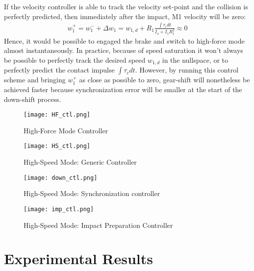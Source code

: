 If the velocity controller is able to track the velocity set-point and the collision is perfectly predicted, then immediately after the impact, M1 velocity will be zero:
%
\begin{align}
w_1^+ =  w_1^- + \Delta w_1 = w_{1,d}  + R_1 \frac{\int{\tau_c dt}}{I_o + I_1 R_1^2} \approx 0
\label{eq:dsdm_impact_vel}
\end{align}
%
Hence, it would be possible to engaged the brake and switch to high-force mode almost instantaneously. In practice, because of speed saturation it won't always be possible to perfectly track the desired speed $w_{1,d}$ in the nullspace, or to perfectly predict the contact impulse $\int{\tau_c dt}$. However, by running this control scheme and bringing $w_1^+$ as close as possible to zero, gear-shift will nonetheless be achieved faster because synchronization error will be smaller at the start of the down-shift process.

\begin{figure}[p]
	\centering
		\texttt{[image: HF\_ctl.png]}
	\caption{High-Force Mode Controller}
	\label{fig:HF_loop}
\end{figure}

\begin{figure}[p]
	\centering
		\texttt{[image: HS\_ctl.png]}
	\caption{High-Speed Mode: Generic Controller}
	\label{fig:HS_loop}
\end{figure}

\begin{figure}[p]
	\centering
		\texttt{[image: down\_ctl.png]}
	\caption{High-Speed Mode: Synchronization controller}
	\label{fig:down_loop}
\end{figure}

\begin{figure}[p]
	\centering
		\texttt{[image: imp\_ctl.png]}
	\caption{High-Speed Mode: Impact Preparation Controller}
	\label{fig:imp_loop}
\end{figure}


\newpage

\section{Experimental Results}
\label{sec:dsdm_exp}

